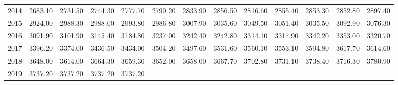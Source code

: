 \begin{longtable}{rrrrrrrrrrrrr}
  2014 & 2683.10 & 2731.50 & 2744.30 & 2777.70 & 2790.20 & 2833.90 & 2856.50 & 2816.60 & 2855.40 & 2853.30 & 2852.80 & 2897.40 \\ 
  2015 & 2924.00 & 2988.30 & 2988.00 & 2993.80 & 2986.80 & 3007.90 & 3035.60 & 3049.50 & 3051.40 & 3035.50 & 3092.90 & 3076.30 \\ 
  2016 & 3091.90 & 3101.90 & 3145.40 & 3184.80 & 3237.00 & 3242.40 & 3242.80 & 3314.10 & 3317.90 & 3342.20 & 3353.00 & 3320.70 \\ 
  2017 & 3396.20 & 3374.00 & 3436.50 & 3434.00 & 3504.20 & 3497.60 & 3531.60 & 3560.10 & 3553.10 & 3594.80 & 3617.70 & 3614.60 \\ 
  2018 & 3648.00 & 3614.00 & 3664.30 & 3659.30 & 3652.00 & 3658.00 & 3667.70 & 3702.80 & 3731.10 & 3738.40 & 3716.30 & 3780.90 \\ 
  2019 & 3737.20 & 3737.20 & 3737.20 & 3737.20 &  &  &  &  &  &  &  &  \\ 
   \hline
\hline
\end{longtable}

